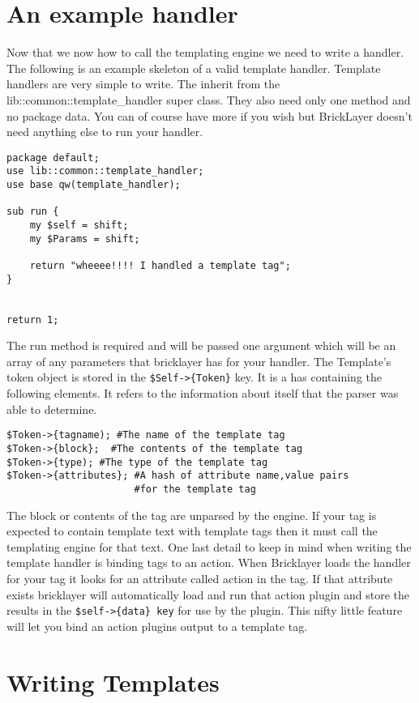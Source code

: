 \section{An example handler}
Now that we now how to call the templating engine we need to write a handler. The following is an example skeleton of a valid template handler. Template handlers are very simple to write. The inherit from the lib::common::template\_handler super class. They also need only one method and no package data. You can of course have more if you wish but BrickLayer doesn't need anything else to run your handler.
\newpage
\begin{verbatim}
package default;
use lib::common::template_handler;
use base qw(template_handler);

sub run {
    my $self = shift;
    my $Params = shift;
    
    return "wheeee!!!! I handled a template tag";   
}


return 1;
\end{verbatim}
The run method is required and will be passed one argument which will be an array of any parameters that bricklayer has for your handler. The Template's token object is stored in the \verb|$Self->{Token}| key. It is a has containing the following elements. It refers to the information about itself that the parser was able to determine.
\begin{verbatim}
$Token->{tagname); #The name of the template tag
$Token->{block};  #The contents of the template tag
$Token->{type); #The type of the template tag
$Token->{attributes}; #A hash of attribute name,value pairs 
                      #for the template tag
\end{verbatim}
The block or contents of the tag are unparsed by the engine. If your tag is expected to contain template text with template tags then it must call the templating engine for that text. One last detail to keep in mind when writing the template handler is binding tags to an action. When Bricklayer loads the handler for your tag it looks for an attribute called action in the tag. If that attribute exists bricklayer will automatically load and run that action plugin and store the results in the \verb|$self->{data} key| for use by the plugin. This nifty little feature will let you bind an action plugins output to a template tag.
\section{Writing Templates}
